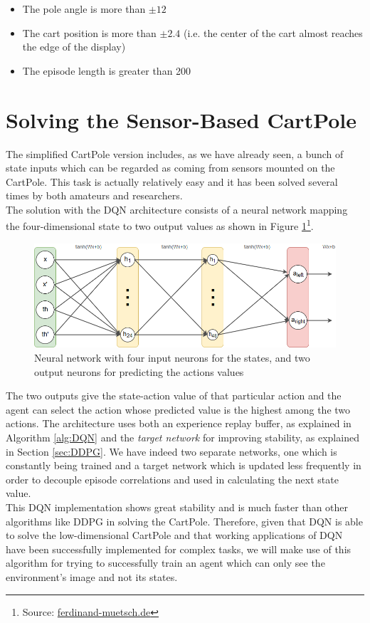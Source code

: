 \begin{itemize}
	\item The pole angle is more than $\pm 12$\textdegree
	\item The cart position is more than $\pm 2.4$ (i.e. the center of the cart almost reaches the edge of the display)
	\item The episode length is greater than 200
  \end{itemize}

\section{Solving the Sensor-Based CartPole}
\label{sec:simpleCartPole}
The simplified CartPole version includes, as we have already seen, a bunch of state inputs which can be regarded as coming from sensors mounted on the CartPole. This task is actually relatively easy and it has been solved several times by both amateurs and researchers.
\\
\indent The solution with the DQN architecture consists of a neural network mapping the four-dimensional state to two output values as shown in Figure \ref{fig:easyDQN}\footnote{Source: \href{https://ferdinand-muetsch.de/CartPole-with-a-deep-q-network.html}{ferdinand-muetsch.de}}.

\begin{figure}[h!]
	\centering
	\label{fig:easyDQN}
	\includegraphics[width=12cm]{images/easycartpoleNN.png}	
	\caption{Neural network with four input neurons for the states, and two output neurons for predicting the actions values} 
\end{figure}

The two outputs give the state-action value of that particular action and the agent can select the action whose predicted value is the highest among the two actions. The architecture uses both an experience replay buffer, as explained in Algorithm \ref{alg:DQN} and the \textit{target network} for improving stability, as explained in Section \ref{sec:DDPG}. We have indeed two separate networks, one which is constantly being trained and a target network which is updated less frequently in order to decouple episode correlations and used in calculating the next state value. 
\\
\indent This DQN implementation shows great stability and is much faster than other algorithms like DDPG in solving the CartPole. Therefore, given that DQN is able to solve the low-dimensional CartPole and that working applications of DQN have been successfully implemented for complex tasks, we will make use of this algorithm for trying to successfully train an agent which can only see the environment's image and not its states.

